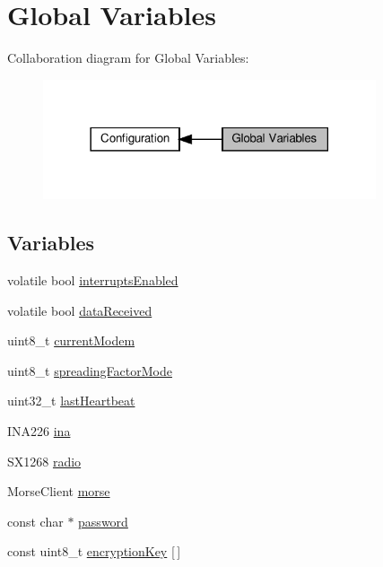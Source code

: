 \hypertarget{group__defines__global__variables}{}\section{Global Variables}
\label{group__defines__global__variables}
Collaboration diagram for Global Variables\+:
\nopagebreak
\begin{figure}[H]
\begin{center}
\leavevmode
\includegraphics[width=278pt]{group__defines__global__variables}
\end{center}
\end{figure}
\subsection*{Variables}
\begin{DoxyCompactItemize}
\item 
volatile bool \hyperlink{group__defines__global__variables_gac4e4a006083dd62a0a607861795b74ad}{interrupts\+Enabled}
\item 
volatile bool \hyperlink{group__defines__global__variables_ga9caaf5e68386ab1a12ef35bee230b1f2}{data\+Received}
\item 
uint8\+\_\+t \hyperlink{group__defines__global__variables_ga3ff59835e905207ccc63426c658ef705}{current\+Modem}
\item 
uint8\+\_\+t \hyperlink{group__defines__global__variables_ga1b7f588d9dfbb3b5e8553ce78dacac8d}{spreading\+Factor\+Mode}
\item 
uint32\+\_\+t \hyperlink{group__defines__global__variables_gad3d1c7107632ee3536eb442026fe08fa}{last\+Heartbeat}
\item 
I\+N\+A226 \hyperlink{group__defines__global__variables_gabef7273c58516662eed53fda518d0eaa}{ina}
\item 
S\+X1268 \hyperlink{group__defines__global__variables_ga4d67d9af4c43901b2f5171b55270e4f7}{radio}
\item 
Morse\+Client \hyperlink{group__defines__global__variables_gad7b71738b4bf5134ae10234ed8dee889}{morse}
\item 
const char $\ast$ \hyperlink{group__defines__global__variables_gaa4a2ebcb494493f648ae1e6975672575}{password}
\item 
const uint8\+\_\+t \hyperlink{group__defines__global__variables_ga2623c5901f38974be6d0186e14cbcfa7}{encryption\+Key} \mbox{[}$\,$\mbox{]}
\end{DoxyCompactItemize}


